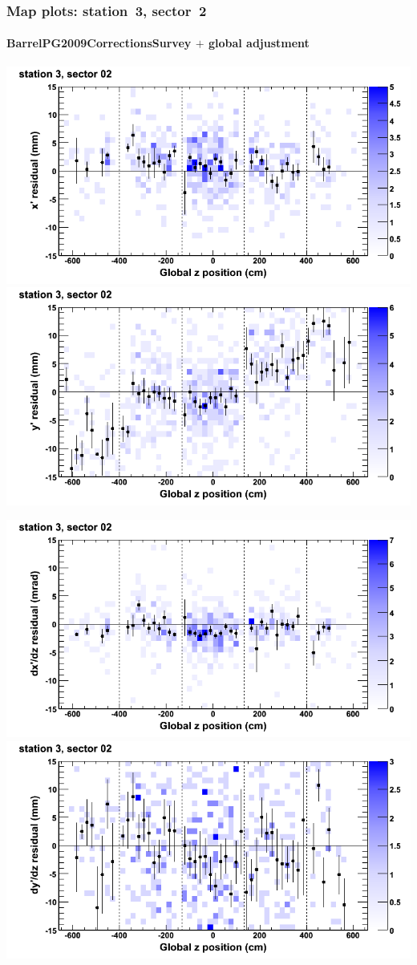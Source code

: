 \documentclass[compress]{beamer}
\begin{document}
\begin{frame}
\frametitle{Map plots: station~3, sector~2}
\framesubtitle{BarrelPG2009CorrectionsSurvey $+$ global adjustment}
\includegraphics[width=0.5\linewidth]{mapplots_re01/DTvsz_st3sec02_x.png}
\includegraphics[width=0.5\linewidth]{mapplots_re01/DTvsz_st3sec02_y.png}

\includegraphics[width=0.5\linewidth]{mapplots_re01/DTvsz_st3sec02_dxdz.png}
\includegraphics[width=0.5\linewidth]{mapplots_re01/DTvsz_st3sec02_dydz.png}
\end{frame}
\end{document}

